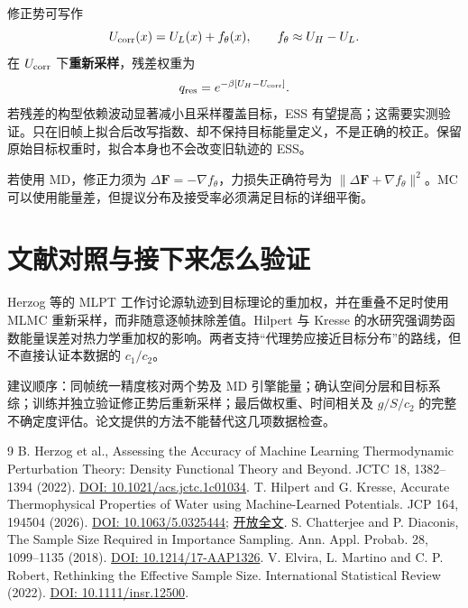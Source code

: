 \documentclass[11pt,a4paper]{article}
\begin{document}
修正势可写作
\begin{equation}
U_{\rm corr}(x)=U_L(x)+f_\theta(x),\qquad f_\theta\approx U_H-U_L.
\end{equation}
在 $U_{\rm corr}$ 下\textbf{重新采样}，残差权重为
\begin{equation}
q_{\rm res}=e^{-\beta[U_H-U_{\rm corr}]}.
\end{equation}
若残差的构型依赖波动显著减小且采样覆盖目标，ESS 有望提高；这需要实测验证。只在旧帧上拟合后改写指数、却不保持目标能量定义，不是正确的校正。保留原始目标权重时，拟合本身也不会改变旧轨迹的 ESS。

若使用 MD，修正力须为 $\Delta\mathbf F=-\nabla f_\theta$，力损失正确符号为
$\|\Delta\mathbf F+\nabla f_\theta\|^2$。MC 可以使用能量差，但提议分布及接受率必须满足目标的详细平衡。

\section{文献对照与接下来怎么验证}
Herzog 等的 MLPT 工作讨论源轨迹到目标理论的重加权，并在重叠不足时使用 MLMC 重新采样，而非随意逐帧抹除差值。Hilpert 与 Kresse 的水研究强调势函数能量误差对热力学重加权的影响。两者支持“代理势应接近目标分布”的路线，但不直接认证本数据的 $c_1/c_2$。

建议顺序：同帧统一精度核对两个势及 MD 引擎能量；确认空间分层和目标系综；训练并独立验证修正势后重新采样；最后做权重、时间相关及 $g/S/c_2$ 的完整不确定度评估。论文提供的方法不能替代这几项数据检查。

\begin{thebibliography}{9}
 B. Herzog et al., Assessing the Accuracy of Machine Learning Thermodynamic Perturbation Theory: Density Functional Theory and Beyond. JCTC 18, 1382--1394 (2022). \href{https://doi.org/10.1021/acs.jctc.1c01034}{DOI: 10.1021/acs.jctc.1c01034}.
 T. Hilpert and G. Kresse, Accurate Thermophysical Properties of Water using Machine-Learned Potentials. JCP 164, 194504 (2026). \href{https://doi.org/10.1063/5.0325444}{DOI: 10.1063/5.0325444}; \href{https://arxiv.org/html/2601.21103v1}{开放全文}.
 S. Chatterjee and P. Diaconis, The Sample Size Required in Importance Sampling. Ann. Appl. Probab. 28, 1099--1135 (2018). \href{https://doi.org/10.1214/17-AAP1326}{DOI: 10.1214/17-AAP1326}.
 V. Elvira, L. Martino and C. P. Robert, Rethinking the Effective Sample Size. International Statistical Review (2022). \href{https://doi.org/10.1111/insr.12500}{DOI: 10.1111/insr.12500}.
\end{thebibliography}
\end{document}
